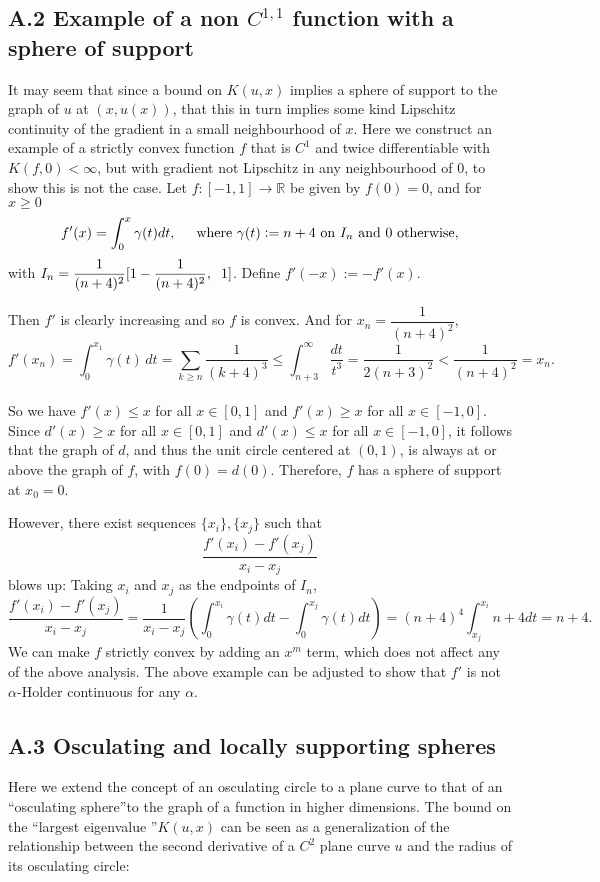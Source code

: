 \documentclass[10pt]{article}
\newenvironment{example}[2][Example]{\begin{trivlist}
\item[\hskip \labelsep {\bfseries #1}\hskip \labelsep {\bfseries #2.}]}{\end{trivlist}}
\begin{document}
\subsection{A.2 Example of a non $C^{1,1}$ function with a sphere of support}
\begin{example}{A.2} It may seem that since a bound on $K(u,x)$ implies a sphere of support to the graph of $u$ at $(x,u(x))$, that this in turn implies some kind Lipschitz continuity of the gradient in a small neighbourhood of $x$. Here we construct an example of a strictly convex function $f$ that is $C^1$ and twice differentiable with $K(f,0)<\infty$, but with gradient not Lipschitz in any neighbourhood of 0, to show this is not the case.
Let $f:[-1,1]\rightarrow \mathbb{R}$ be given by $f(0)=0$, and for $x\geq 0$
\begin{align*}
f'(x)=\int_0^x \gamma(t)dt, \hspace{5mm} \text{where } \gamma(t):=n+4 \text{ on } I_n \text{ and } 0 \text{ otherwise,}
\end{align*}
with $I_n= \dfrac{1}{(n+4)^2}[1-\dfrac{1}{(n+4)^2},\hspace{2mm}1]$. Define $f'(-x):=-f'(x)$. 

Then $f'$ is clearly increasing and so $f$ is convex. And for $x_n =\dfrac{1}{(n+4)^2}$,
$$f'(x_n)=\int_{0}^{x_1}\gamma(t)\,dt=\sum_{k\geq n}\frac{1}{(k+4)^3}\leq\int_{n+3}^{\infty}\frac{dt}{t^3}= \frac{1}{2(n+3)^2}<\frac{1}{(n+4)^2}=x_n.$$\\
So we have $f'(x)\leq x$ for all $x \in [0,1]$ and $f'(x)\geq x$ for all $x \in [-1,0]$. Since $d'(x)\geq x$ for all $x \in [0,1]$ and $d'(x)\leq x$ for all $x \in [-1,0]$, it follows that the graph of $d$, and thus the unit circle centered at $(0,1)$, is always at or above the graph of $f$, with $f(0)=d(0)$. Therefore, $f$ has a sphere of support at $x_0=0$.

However, there exist sequences $\{x_i\}, \{x_j\}$ such that
$$\dfrac{f'(x_i)-f'(x_j)}{x_i-x_j}$$ blows up: Taking $x_i$ and $x_j$ as the endpoints of $I_n$,
$$ \dfrac{f'(x_i)-f'(x_j)}{x_i-x_j} = \frac{1}{x_i-x_j}\left( \int_0^{x_i} \gamma(t)dt - \int_0^{x_j} \gamma(t)dt\right) = (n+4)^4 \int_{x_j}^{x_i} n+4 dt=n+4.$$
We can make $f$ strictly convex by adding an $x^m$ term, which does not affect any of the above analysis. The above example can be adjusted to show that $f'$ is not $\alpha$-Holder continuous for any $\alpha$.
\end{example}
\subsection{A.3 Osculating and locally supporting spheres }
Here we extend the concept of an osculating circle to a plane curve to that of an \textquotedblleft osculating sphere\textquotedblright to the graph of a function in higher dimensions. The bound on the \textquotedblleft largest eigenvalue \textquotedblright $K(u,x)$ can be seen as a generalization of the relationship between the second derivative of a $C^2$ plane curve $u$ and the radius of its osculating circle:
\end{document}
